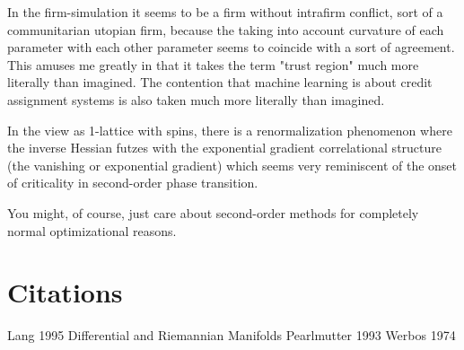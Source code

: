 \documentclass{article}
\begin{document}
In the firm-simulation it seems to be a firm without intrafirm conflict, sort of a communitarian utopian firm, because the taking into account curvature of each parameter with each other parameter seems to coincide with a sort of agreement. This amuses me greatly in that it takes the term "trust region" much more literally than imagined. The contention that machine learning is about credit assignment systems is also taken much more literally than imagined.

In the view as 1-lattice with spins, there is a renormalization phenomenon where the inverse Hessian futzes with the exponential gradient correlational structure (the vanishing or exponential gradient) which seems very reminiscent of the onset of criticality in second-order phase transition.

You might, of course, just care about second-order methods for completely normal optimizational reasons.

\section{Citations}

Lang 1995 Differential and Riemannian Manifolds
Pearlmutter 1993
Werbos 1974

\end{document}
